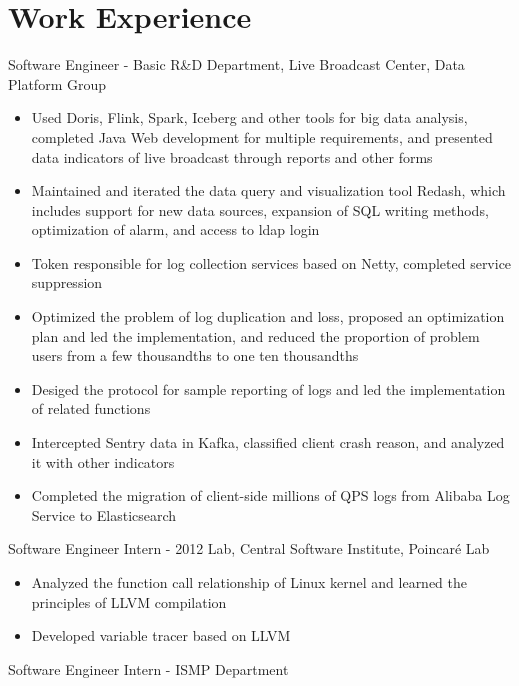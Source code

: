 \documentclass{resume}
\begin{document}
\section{Work Experience}
Software Engineer - Basic R\&D Department, Live Broadcast Center, Data Platform Group
\begin{itemize}[parsep=0.25ex]
    \item Used Doris, Flink, Spark, Iceberg and other tools for big data analysis, completed Java Web development for multiple requirements, and presented data indicators of live broadcast through reports and other forms
    \item Maintained and iterated the data query and visualization tool Redash, which includes support for new data sources, expansion of SQL writing methods, optimization of alarm, and access to ldap login
    \item Token responsible for log collection services based on Netty, completed service suppression
    \item Optimized the problem of log duplication and loss, proposed an optimization plan and led the implementation, and reduced the proportion of problem users from a few thousandths to one ten thousandths
    \item Desiged the protocol for sample reporting of logs and led the implementation of related functions
    \item Intercepted Sentry data in Kafka, classified client crash reason, and analyzed it with other indicators
    \item Completed the migration of client-side millions of QPS logs from Alibaba Log Service to Elasticsearch
\end{itemize}
Software Engineer Intern - 2012 Lab, Central Software Institute, Poincaré Lab
\begin{itemize}[parsep=0.25ex]
    \item Analyzed the function call relationship of Linux kernel and learned the principles of LLVM compilation
    \item Developed variable tracer based on LLVM
\end{itemize}
Software Engineer Intern - ISMP Department
\end{document}
